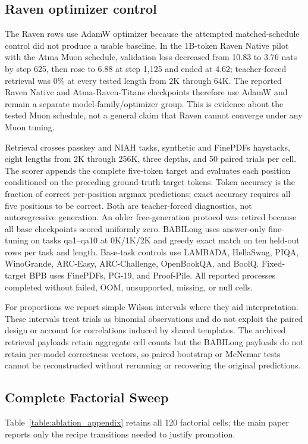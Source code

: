 \subsection{Raven optimizer control}
The Raven rows use AdamW optimizer because the attempted matched-schedule control did not produce a usable baseline. In the 1B-token Raven Native pilot with the Atma Muon schedule, validation loss decreased from 10.83 to 3.76 nats by step 625, then rose to 6.88 at step 1,125 and ended at 4.62; teacher-forced retrieval was 0\% at every tested length from 2K through 64K. The reported Raven Native and Atma-Raven-Titans checkpoints therefore use AdamW and remain a separate model-family/optimizer group. This is evidence about the tested Muon schedule, not a general claim that Raven cannot converge under any Muon tuning.

Retrieval crosses passkey and NIAH tasks, synthetic and FinePDFs haystacks, eight lengths from 2K through 256K, three depths, and 50 paired trials per cell. The scorer appends the complete five-token target and evaluates each position conditioned on the preceding ground-truth target tokens. Token accuracy is the fraction of correct per-position argmax predictions; exact accuracy requires all five positions to be correct. Both are teacher-forced diagnostics, not autoregressive generation. An older free-generation protocol was retired because all base checkpoints scored uniformly zero. BABILong uses answer-only fine-tuning on tasks qa1--qa10 at 0K/1K/2K and greedy exact match on ten held-out rows per task and length. Base-task controls use LAMBADA, HellaSwag, PIQA, WinoGrande, ARC-Easy, ARC-Challenge, OpenBookQA, and BoolQ. Fixed-target BPB uses FinePDFs, PG-19, and Proof-Pile. All reported processes completed without failed, OOM, unsupported, missing, or null cells.

For proportions we report simple Wilson intervals where they aid interpretation. These intervals treat trials as binomial observations and do not exploit the paired design or account for correlations induced by shared templates. The archived retrieval payloads retain aggregate cell counts but the BABILong payloads do not retain per-model correctness vectors, so paired bootstrap or McNemar tests cannot be reconstructed without rerunning or recovering the original predictions.

\begin{landscape}
\section{Complete Factorial Sweep}
\label{appendix:full_ablation}

Table~\ref{table:ablation_appendix} retains all 120 factorial cells; the main paper reports only the recipe transitions needed to justify promotion.
\begingroup
\normalsize
\setlength{\tabcolsep}{5pt}

\endgroup
\end{landscape}

